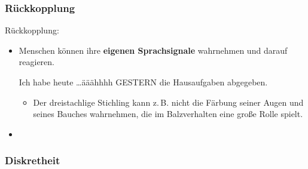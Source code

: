 \subsubsection{Rückkopplung}

\begin{frame}{Rückkopplung:}
	
	\begin{itemize}
		\item<1-> Menschen können ihre \textbf{eigenen Sprachsignale} wahrnehmen und darauf reagieren.
		
\ea Ich habe heute \ldots ääähhhh GESTERN die Hausaufgaben abgegeben.
\z

\begin{itemize}
	\item<2->[$\rightarrow$] Der dreistachlige Stichling kann z.\,B. nicht die Färbung seiner Augen und seines Bauches wahrnehmen, die im Balzverhalten eine große Rolle spielt.
\end{itemize}
			\item[]
		\end{itemize}

\end{frame}


\subsubsection{Diskretheit}

